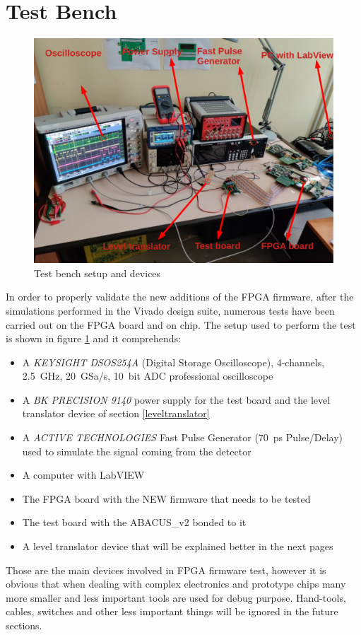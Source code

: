 \section{Test Bench}\label{testbench}
\begin{figure}[H]
	\centering
	\includegraphics[width=0.7\linewidth]{IMG/ch5/TESTBENCH}
	\caption{Test bench setup and devices}
	\label{fig:testbench}
\end{figure}
In order to properly validate the new additions of the FPGA firmware, after the simulations performed in the Vivado design suite, numerous tests have been carried out on the FPGA board and on chip.
The setup used to perform the test is shown in figure \ref{fig:testbench} and it comprehends:
\begin{itemize}
	\item A \textit{KEYSIGHT DSOS254A} (Digital Storage Oscilloscope), 4-channels, 2.5~GHz, 20~GSa/s, 10~bit ADC professional oscilloscope
	\item A \textit{BK PRECISION 9140} power supply for the test board and the level translator device of section \ref{leveltranslator}
	\item A \textit{ACTIVE TECHNOLOGIES} Fast Pulse Generator (70~ps Pulse/Delay) used to simulate the signal coming from the detector
	\item A computer with LabVIEW 
	\item The FPGA board with the NEW firmware that needs to be tested
	\item The test board with the ABACUS\_v2 bonded to it
	\item A level translator device that will be explained better in the next pages
\end{itemize}
\noindent Those are the main devices involved in FPGA firmware test, however it is obvious that when dealing with complex electronics and prototype chips many more smaller and less important tools are used for debug purpose. Hand-tools, cables, switches and other less important things will be ignored in the future sections.


